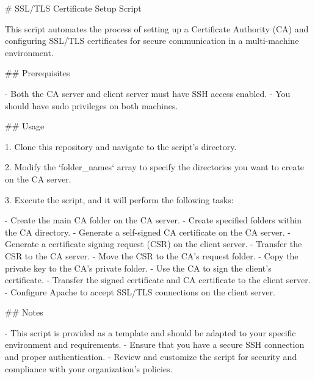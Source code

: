 # SSL/TLS Certificate Setup Script

This script automates the process of setting up a Certificate Authority (CA) and configuring SSL/TLS certificates for secure communication in a multi-machine environment.

## Prerequisites

- Both the CA server and client server must have SSH access enabled.
- You should have sudo privileges on both machines.

## Usage

1. Clone this repository and navigate to the script's directory.

2. Modify the `folder_names` array to specify the directories you want to create on the CA server.

3. Execute the script, and it will perform the following tasks:

   - Create the main CA folder on the CA server.
   - Create specified folders within the CA directory.
   - Generate a self-signed CA certificate on the CA server.
   - Generate a certificate signing request (CSR) on the client server.
   - Transfer the CSR to the CA server.
   - Move the CSR to the CA's request folder.
   - Copy the private key to the CA's private folder.
   - Use the CA to sign the client's certificate.
   - Transfer the signed certificate and CA certificate to the client server.
   - Configure Apache to accept SSL/TLS connections on the client server.

## Notes

- This script is provided as a template and should be adapted to your specific environment and requirements.
- Ensure that you have a secure SSH connection and proper authentication.
- Review and customize the script for security and compliance with your organization's policies.
